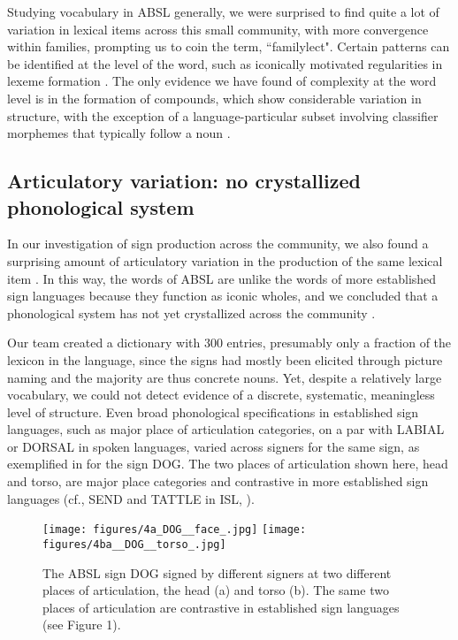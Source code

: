 \documentclass[output=paper]{langsci/langscibook}
\begin{document}
   Studying vocabulary in ABSL generally, we were surprised to find quite a lot of variation in lexical items across this small community, with more convergence within families, prompting us to coin the term, ``familylect".  Certain patterns can be identified at the level of the word, such as iconically motivated regularities in lexeme formation \citep{Padden2013,Lepic2016}.  The only evidence we have found of complexity at the word level is in the formation of compounds, which show considerable variation in structure, with the exception of a language-particular subset involving classifier morphemes that typically follow a noun \citep{Meir2010,Sandler2011a}. 


\subsection{Articulatory variation: no crystallized phonological system}

In our investigation of sign production across the community, we also found a surprising amount of articulatory variation in the production of the same lexical item %
\citep{IsraelSandler2011}.   In this way, the words of ABSL are unlike the words of more established sign languages because they function as iconic wholes, and we concluded that a phonological system has not yet crystallized across the community \citep{Sandler2011a}.

Our team created a dictionary with 300 entries, presumably only a fraction of the lexicon in the language, since the signs had mostly been elicited through picture naming and the majority are thus concrete nouns.  Yet, despite a relatively large vocabulary, we could not detect evidence of a discrete, systematic, meaningless level of structure. Even broad phonological specifications in established sign languages, such as major place of articulation categories, on a par with LABIAL or DORSAL in spoken languages, varied across signers for the same sign, as exemplified in  for the sign DOG.  The two places of articulation shown here, head and torso, are major place categories and contrastive in more established sign languages (cf., SEND and TATTLE in ISL, ).   

\begin{figure}
\texttt{[image: figures/4a\_DOG\_\_face\_.jpg]}
\texttt{[image: figures/4ba\_\_DOG\_\_torso\_.jpg]}
\caption{The ABSL sign DOG signed by different signers at two different places of articulation, the head (a) and torso (b). The same two places of articulation are contrastive in established sign languages (see Figure 1).}
\label{fig:sandler:4}
\end{figure}
\end{document}

